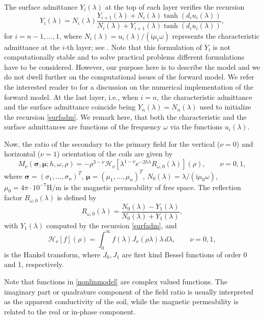 \documentclass[final,leqno]{siamltex}
\newcommand{\ii}{{\mathrm{i}}}
\newcommand{\sigmab}{\boldsymbol{\sigma}}
\newcommand{\mub}{\boldsymbol{\mu}}
\begin{document}
The surface admittance $Y_i(\lambda)$ at the top of each layer verifies the
recursion 
\begin{equation}
	\label{surfadm}
	Y_i(\lambda) = N_i(\lambda)\frac{Y_{i+1}(\lambda)+N_i(\lambda)
		\tanh(d_i u_i(\lambda))}{N_i(\lambda) + Y_{i+1}(\lambda)
		\tanh(d_i u_i(\lambda))},
\end{equation}
for $i=n-1,\ldots,1$, where $N_i(\lambda)= u_i(\lambda)/(\ii\mu_i\omega)$ represents the characteristic admittance at the $i$-th layer; see \cite{wait2}. Note that this formulation of $Y_i$ is not computationally stable and to solve practical problems different formulations have to be considered. However, our purpose here is to describe the model and we do not dwell further on the computational issues of the forward model. We refer the interested reader to \cite{ddflr20} for a discussion on the numerical implementation of the forward model.  At the last layer, i.e., when $i=n$, the characteristic admittance and the surface admittance coincide being $Y_n(\lambda) = N_n(\lambda)$ used to initialize the recursion \eqref{surfadm}.
We remark here, that both the characteristic and the surface admittances are functions
of the frequency $\omega$ via the functions $u_i(\lambda)$.

Now, the ratio of the secondary to the primary field for the vertical ($\nu=0$) and horizontal ($\nu=1$) orientation of the coils are given by
\begin{equation}\label{nonlinmodel}
		M_\nu(\sigmab,\mub;h,\omega,\rho) = -\rho^{3-\nu} \mathcal{H}_\nu\left[\lambda^{1-\nu} e^{-2h\lambda} R_{\omega,0}(\lambda) \right](\rho),\qquad \nu=0,1,
\end{equation}
where $\sigmab=(\sigma_1,\ldots,\sigma_n)^T$, $\mub=(\mu_1,\ldots,\mu_n)^T$,
$N_0(\lambda)=\lambda/(\ii\mu_0\omega)$, $\mu_0=4\pi\cdot 10^{-7}$H/m is the
magnetic permeability of free space. The reflection factor $R_{\omega,0}(\lambda)$ is defined by
\begin{equation*}
	R_{\omega,0}(\lambda) = \frac{N_0(\lambda) - Y_1(\lambda)}{N_0(\lambda) + Y_1(\lambda)},
\end{equation*}
with $Y_1(\lambda)$ computed by the recursion \eqref{surfadm}, and
$$
\mathcal{H}_\nu[f](\rho) = \int_{0}^{\infty} f(\lambda) J_\nu(\rho\lambda)
\lambda \,d\lambda , \qquad \nu=0,1,
$$
is the Hankel transform, where $J_0,J_1$ are first kind Bessel functions of order
0 and 1, respectively. 

Note that functions in \eqref{nonlinmodel} are complex valued functions. The imaginary part or quadrature component of the field ratio is usually interpreted as the apparent conductivity of the soil, while the magnetic permeability is related to the real or in-phase component.
\end{document}
